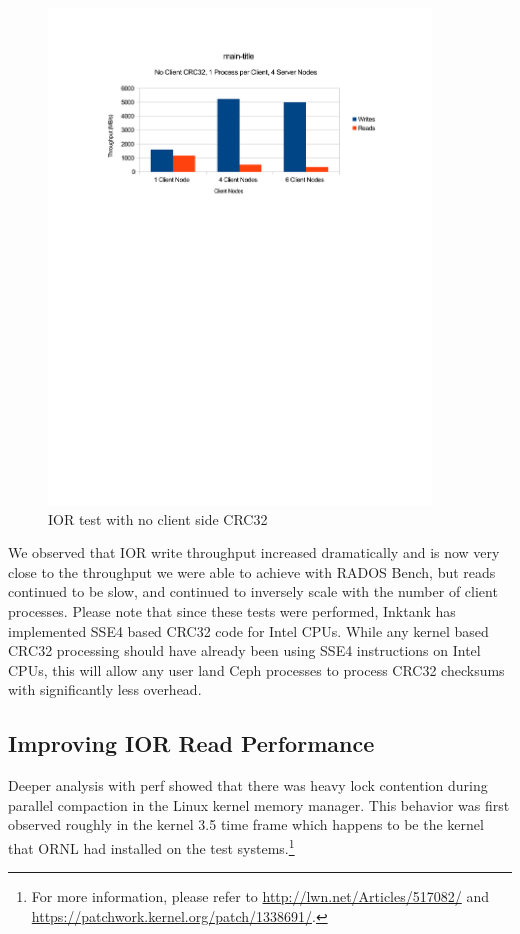 \documentclass{article}
\begin{document}
\begin{figure}[htb]
\centering
\includegraphics[width=4in]{ior-client-no-crc32}
\caption{IOR test with no client side CRC32}
\label{fig:ior-no-client-crc32}
\end{figure}

We observed that IOR write throughput increased dramatically and is now very
close to the throughput we were able to achieve with RADOS Bench, but reads
continued to be slow, and continued to inversely scale with the number of client
processes.  Please note that since these tests were performed, Inktank has
implemented SSE4 based CRC32 code for Intel CPUs.  While any kernel based CRC32
processing should have already been using SSE4 instructions on Intel CPUs, this
will allow any user land Ceph processes to process CRC32 checksums with
significantly less overhead.

\subsection{Improving IOR Read Performance}

Deeper analysis with perf showed that there was heavy lock contention during
parallel compaction in the Linux kernel memory manager.  This behavior was first
observed roughly in the kernel 3.5 time frame which happens to be the kernel
that ORNL had installed on the test systems.\footnote{For more information,
please refer to \url{http://lwn.net/Articles/517082/} and
\url{https://patchwork.kernel.org/patch/1338691/}.}
\end{document}
